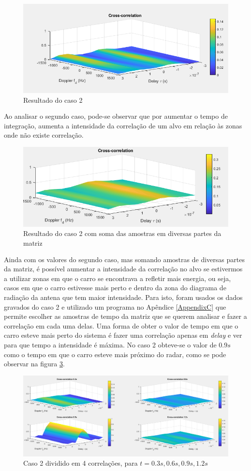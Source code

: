 \begin{figure}[h]
\centering
\includegraphics[scale=0.5]{chapters/ch5/assets/15mm}
\caption[Caso 2]{Resultado do caso 2}
\label{fig:15mm}
\end{figure}

Ao analisar o segundo caso, pode-se observar que por aumentar o tempo de integração, aumenta a intensidade da correlação de um alvo em relação às zonas onde não existe correlação.


\begin{figure}[h]
\centering
\includegraphics[scale=0.5]{chapters/ch5/assets/15mmsum}
\caption[Caso 2 especial]{Resultado do caso 2 com soma das amostras em diversas partes da matriz}
\label{fig:15mmsum}
\end{figure}

Ainda com os valores do segundo caso, mas somando amostras de diversas partes da matriz, é possível aumentar a intensidade da correlação no alvo se estivermos a utilizar zonas em que o carro se encontrava a refletir mais energia, ou seja, casos em que o carro estivesse mais perto e dentro da zona do diagrama de radiação da antena que tem maior intensidade. Para isto, foram usados os dados gravados do caso 2 e utilizado um programa no Apêndice \ref{AppendixC} que permite escolher as amostras de tempo da matriz que se querem analisar e fazer a correlação em cada uma delas. Uma forma de obter o valor de tempo em que o carro esteve mais perto do sistema é fazer uma correlação apenas em \textit{delay} e ver para que tempo a intensidade é máxima. No caso 2 obteve-se o valor de $0.9 s$ como o tempo em que o carro esteve mais próximo do radar, como se pode observar na figura \ref{fig:4ca}.

\begin{figure}[h]
\centering
\includegraphics[scale=0.35]{chapters/ch5/assets/4ca}
\caption[Caso 2 dividido em 4 correlações]{Caso 2 dividido em 4 correlações, para $t=0.3s, 0.6s, 0.9s, 1.2s$}
\label{fig:4ca}
\end{figure}
